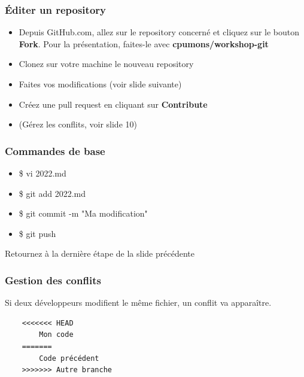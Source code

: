 \documentclass{beamer}
\begin{document}
\begin{frame}\frametitle{Éditer un repository}
    \begin{itemize}
    \item Depuis GitHub.com, allez sur le repository concerné et cliquez sur le bouton \textbf{Fork}. Pour la présentation, faites-le avec \textbf{cpumons/workshop-git}\\
        \item Clonez sur votre machine le nouveau repository \\
        \item Faites vos modifications (voir slide suivante) \\
        \item Créez une pull request en cliquant sur \textbf{Contribute}
        \item (Gérez les conflits, voir slide 10)
    \end{itemize}
\end{frame}


\begin{frame}\frametitle{Commandes de base}
    \begin{itemize}
        \item \$ vi 2022.md
        \item \$ git add 2022.md
        \item \$ git commit -m "Ma modification"
        \item \$ git push
    \end{itemize}

    Retournez à la dernière étape de la slide précédente
\end{frame}


\begin{frame}[fragile]\frametitle{Gestion des conflits}
    Si deux développeurs modifient le même fichier, un conflit va apparaître.
    \begin{verbatim}
    <<<<<<< HEAD
        Mon code
    =======
        Code précédent
    >>>>>>> Autre branche
    \end{verbatim}
\end{frame}

\end{document}
